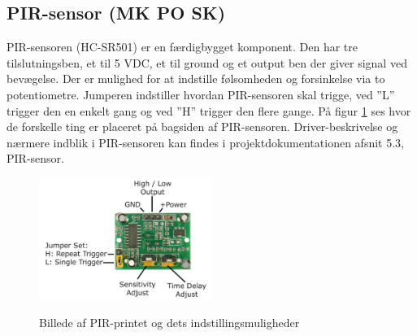 \subsection{PIR-sensor (MK PO SK)}

PIR-sensoren (HC-SR501) er en færdigbygget komponent. Den har tre tilslutningsben, et til 5 VDC, et til ground og et output ben der giver signal ved bevægelse. Der er mulighed for at indstille følsomheden og forsinkelse via to potentiometre. Jumperen indstiller hvordan PIR-sensoren skal trigge, ved ''L'' trigger den en enkelt gang og ved ''H'' trigger den flere gange. På figur \ref{lab:pir_overview} ses hvor de forskelle ting er placeret på bagsiden af PIR-sensoren. Driver-beskrivelse og nærmere indblik i PIR-sensoren kan findes i projektdokumentationen afsnit 5.3, PIR-sensor.

\begin{figure}[H] \centering
{\includegraphics[width=0.5\textwidth]{Billeder/pir_overview}}
\caption{Billede af PIR-printet og dets indstillingsmuligheder}
\label{lab:pir_overview}
\raggedright
\end{figure}



